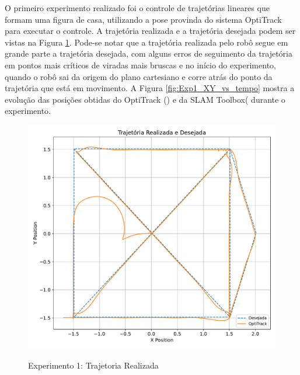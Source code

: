 O primeiro experimento realizado foi o controle de trajetórias lineares que formam uma figura de casa, utilizando a pose provinda do sistema OptiTrack para executar o controle. A trajetória realizada e a trajetória desejada podem ser vistas na Figura \ref{fig:Exp1_Trajetoria_VRPN_LINEAR}. Pode-se notar que a trajetória realizada pelo robô segue em grande parte a trajetória desejada, com alguns erros de seguimento da trajetória em pontos mais críticos de viradas mais bruscas e no início do experimento, quando o robô sai da origem do plano cartesiano e corre atrás do ponto da trajetória que está em movimento. A Figura \ref{fig:Exp1_XY_vs_tempo} mostra a evolução das posições obtidas do OptiTrack () e da SLAM Toolbox( durante o experimento.

\begin{figure}[htb]
    \centering
    \caption{Experimento 1: Trajetoria Realizada}
    \includegraphics[width=0.8\linewidth]{img/Resultados/Exp1_VRPN_Control_LINEAR/Trajetoria.pdf}
    \label{fig:Exp1_Trajetoria_VRPN_LINEAR}
    \source
\end{figure}


